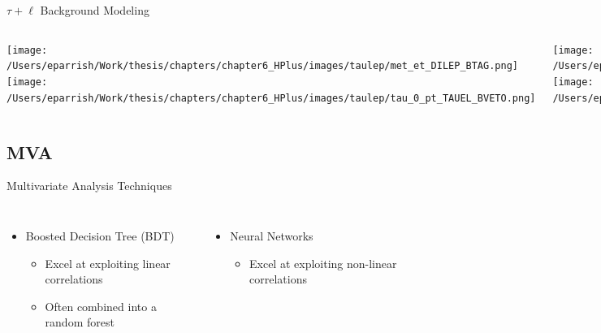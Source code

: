 \documentclass[aspectratio=169,xcolor=table]{beamer}
\begin{document}
    \begin{frame}[t]{$\tau+\ell$ Background Modeling}
      \begin{columns}[t]

        \texttt{[image: /Users/eparrish/Work/thesis/chapters/chapter6\_HPlus/images/taulep/met\_et\_DILEP\_BTAG.png]}
        \texttt{[image: /Users/eparrish/Work/thesis/chapters/chapter6\_HPlus/images/taulep/tau\_0\_pt\_TAUEL\_BVETO.png]}

        \texttt{[image: /Users/eparrish/Work/thesis/chapters/chapter6\_HPlus/images/taulep/lep\_0\_pt\_DILEP\_BTAG.png]}
        \texttt{[image: /Users/eparrish/Work/thesis/chapters/chapter6\_HPlus/images/taulep/lep\_0\_pt\_TAUEL\_BVETO.png]}

        \texttt{[image: /Users/eparrish/Work/thesis/chapters/chapter6\_HPlus/images/taulep/tau\_0\_pt\_SS\_TAUEL.png]}
        \texttt{[image: /Users/eparrish/Work/thesis/chapters/chapter6\_HPlus/images/taulep/tau\_0\_pt\_SS\_TAUMU.png]}


        \texttt{[image: /Users/eparrish/Work/thesis/chapters/chapter6\_HPlus/images/taulep/lep\_0\_pt\_SS\_TAUEL.png]}
        \texttt{[image: /Users/eparrish/Work/thesis/chapters/chapter6\_HPlus/images/taulep/lep\_0\_pt\_SS\_TAUMU.png]}

      \end{columns}
    \end{frame}

  \subsection{ MVA }

    \begin{frame}[t]{Multivariate Analysis Techniques}
      \begin{columns}
        \begin{itemize}
          \item Boosted Decision Tree (BDT)
          \begin{itemize}
            \item Excel at exploiting linear correlations
            \item Often combined into a random forest
          \end{itemize}
        \end{itemize}

        \begin{itemize}
          \item Neural Networks
          \begin{itemize}
            \item Excel at exploiting non-linear correlations
          \end{itemize}
        \end{itemize}
      \end{columns}
    \end{frame}
\end{document}

